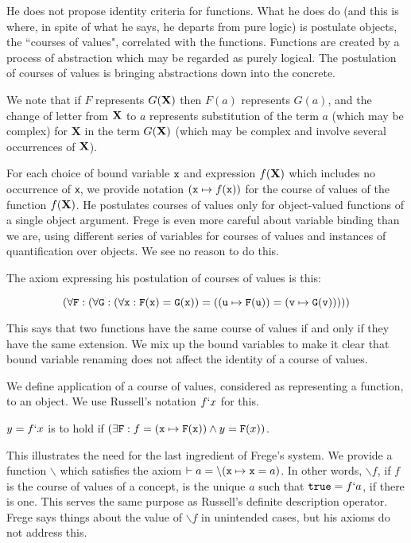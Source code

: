 \documentclass[12pt]{article}
\begin{document}
He does not propose identity criteria for functions.  What he does do (and this is where, in spite of what he says, he departs from pure logic) is postulate objects, the ``courses of values", correlated with the functions.  Functions are created by a process of abstraction which may be regarded as purely logical.  The postulation of courses of values is bringing abstractions down into the concrete.

We note that if $F$ represents $G({\bf X})$ then $F(a)$ represents $G(a)$, and the change of letter from ${\bf X}$ to $a$ represents substitution of the term $a$ (which may be complex)
for {\bf X} in the term $G({\bf X})$ (which may be complex and involve several occurrences of ${\bf X}$).

For each choice of bound variable ${\tt x}$ and expression $f({\bf X})$ which includes no occurrence of {\tt x}, we provide notation $({\tt x} \mapsto f({\tt x}))$ for the course of values of the function $f({\bf X})$.  He postulates courses of values only for object-valued functions of a single object argument.  Frege is even more careful about variable binding than we are, using different series of variables
for courses of values and instances of quantification over objects.  We see no reason to do this.

The axiom expressing his postulation of courses of values is this:

$$(\forall {\tt F}:(\forall {\tt G}:(\forall {\tt x}:{\tt F}({\tt x}) = {\tt G}({\tt x})) = (({\tt u} \mapsto {\tt F}({\tt u})) = ({\tt v} \mapsto {\tt G}({\tt v})))))$$

This says that two functions have the same course of values if and only if they have the same extension.  We mix up the bound variables to make it clear that bound variable renaming does not affect the identity
of a course of values.

We define application of a course of values, considered as representing a function, to an object.  We use Russell's notation $f`x$ for this.

$y = f`x$ is to hold if $(\exists {\tt F}: f = ({\tt x} \mapsto {\tt F}({\tt x})) \wedge y = {\tt F}(x))$.

This illustrates the need for the last ingredient of Frege's system.  We provide a function $\backslash$ which satisfies the axiom $\vdash a=\backslash({\tt x} \mapsto {\tt x}=a)$.
In other words, $\backslash f$, if $f$ is the course of values of a concept, is the unique $a$ such that ${\tt true} = f`a$, if there is one.   This serves the same purpose as Russell's definite description operator.  Frege says things about the value of $\backslash f$ in unintended cases, but his axioms do not address this.
\end{document}
